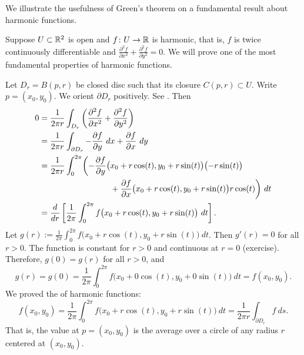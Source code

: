 We illustrate the usefulness of Green's theorem on a fundamental result
about harmonic functions.

\begin{example}
Suppose $U \subset {\mathbb{R}}^2$ is open and
$f \colon U \to {\mathbb{R}}$ is harmonic, that is, $f$ is twice continuously
differentiable and
$\frac{\partial^2 f}{\partial x^2} +
\frac{\partial^2 f}{\partial y^2} = 0$.
We will prove one of the most fundamental properties of harmonic functions.

Let $D_r = B(p,r)$ be closed disc such that its closure $C(p,r) \subset U$.  Write
$p = (x_0,y_0)$.  We orient
$\partial D_r$ positively.  See .
Then
\begin{equation*}
\begin{split}
0
& =
\frac{1}{2\pi r}
\int_{D_r}
\left(
\frac{\partial^2 f}{\partial x^2} +
\frac{\partial^2 f}{\partial y^2}
\right)
\\
& 
=
\frac{1}{2\pi r}
\int_{\partial D_r}
- \frac{\partial f}{\partial y} ~ dx + 
\frac{\partial f}{\partial x} ~ dy
\\
&
=
\frac{1}{2\pi r}
\int_0^{2\pi}
\biggl(
- \frac{\partial f}{\partial y} \bigl(x_0+r\cos(t),y_0+r\sin(t)\bigr) \bigl(-r\sin(t)\bigr)
\\
& \hspace{1.2in}
+ \frac{\partial f}{\partial x} \bigl(x_0+r\cos(t),y_0+r\sin(t)\bigr) r\cos(t)
\biggr) ~ dt
\\
&
=
\frac{d}{dr}
\left[
\frac{1}{2\pi}
\int_0^{2\pi}
f\bigl(x_0+r\cos(t),y_0+r\sin(t)\bigr) ~ dt
\right] .
\end{split}
\end{equation*}
Let $g(r) := 
\frac{1}{2\pi}
\int_0^{2\pi}
f\bigl(x_0+r\cos(t),y_0+r\sin(t)\bigr) ~ dt$.  Then $g'(r) = 0$ for all
$r > 0$.
The function is constant for $r >0$ and continuous at $r=0$ (exercise).
Therefore, $g(0) = g(r)$ for all $r > 0$, and
\begin{equation*}
g(r) = g(0) = 
\frac{1}{2\pi}
\int_0^{2\pi}
f\bigl(x_0+0\cos(t),y_0+0\sin(t)\bigr) ~ dt
=
f(x_0,y_0).
\end{equation*}
We
proved the \emph{} of harmonic functions:
\begin{equation*}
f(x_0,y_0) = 
\frac{1}{2\pi}
\int_0^{2\pi}
f\bigl(x_0+r\cos(t),y_0+r\sin(t)\bigr) ~ dt 
=
\frac{1}{2\pi r}
\int_{\partial D_r} f ~ ds .
\end{equation*}
That is, the value at $p = (x_0,y_0)$ is the average over a circle of any
radius $r$ centered at $(x_0,y_0)$.
\end{example}

